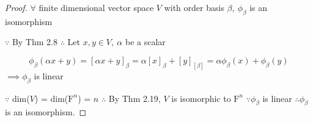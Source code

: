 \begin{proof}
	$\forall$ finite dimensional vector space $V$ with order basis $\beta,~\phi_{\beta}$ is an isomorphism 
	
	$\because$ By Thm 2.8 $\therefore$ Let $x,y \in V,~\alpha$ be a scalar
	
	$$\phi_{\beta}(\alpha x + y) = [\alpha x + y]_{\beta} = \alpha [x]_{\beta} + [y]_[\beta] = \alpha \phi_{\beta}(x) + \phi_{\beta}(y) $$
	$\implies \phi_{\beta}$ is linear 
	
	$\because$ dim($V$) = dim($\mathrm{F}^n$) = $n$ $\therefore$ By Thm 2.19, $V$ is isomorphic to $\mathrm{F}^n$ $\because \phi_{\beta}$ is linear $\therefore \phi_{\beta}$ is an isomorphism.
\end{proof}
